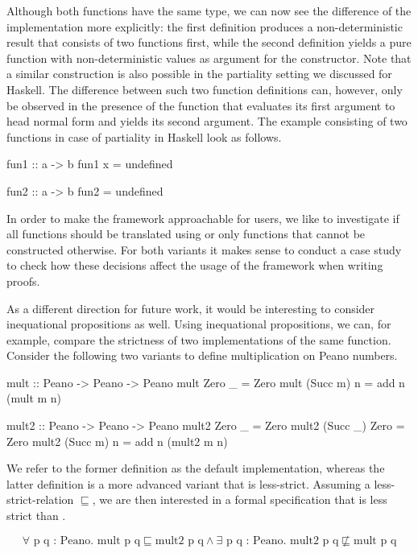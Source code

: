 Although both functions have the same type, we can now see the difference of the implementation more explicitly: the first definition produces a non\--deterministic result that consists of two functions first, while the second definition yields a pure function with non\--deterministic values as argument for the  constructor.
Note that a similar construction is also possible in the partiality setting we discussed for Haskell.
The difference between such two function definitions can, however, only be observed in the presence of the function  that evaluates its first argument to head normal form and yields its second argument.
The example consisting of two functions in case of partiality in Haskell look as follows.

\begin{haskellcode}
fun1 :: a -> b
fun1 x = undefined

fun2 :: a -> b
fun2 = undefined
\end{haskellcode}

In order to make the framework approachable for users, we like to investigate if all functions should be translated using  or only functions that cannot be constructed otherwise.
For both variants it makes sense to conduct a case study to check how these decisions affect the usage of the framework when writing proofs.

As a different direction for future work, it would be interesting to consider inequational propositions as well.
Using inequational propositions, we can, for example, compare the strictness of two implementations of the same function.
Consider the following two variants to define multiplication on Peano numbers.

\begin{haskellcode}
mult :: Peano -> Peano -> Peano
mult Zero    _ = Zero
mult (Succ m) n = add n (mult m n)

mult2 :: Peano -> Peano -> Peano
mult2 Zero     _    = Zero
mult2 (Succ _) Zero = Zero
mult2 (Succ m) n    = add n (mult2 m n)
\end{haskellcode}

We refer to the former definition as the default implementation, whereas the latter definition is a more advanced variant that is less\--strict.
Assuming a less\--strict\--relation $\sqsubseteq$, we are then interested in a formal specification that  is less strict than .

\[
\forall \text{ p q : Peano}. \text{ mult p q} \sqsubseteq \text{mult2
  p q} \wedge \exists \text{ p q : Peano}. \text{ mult2 p q} \not \sqsubseteq \text{mult p q}
\]


